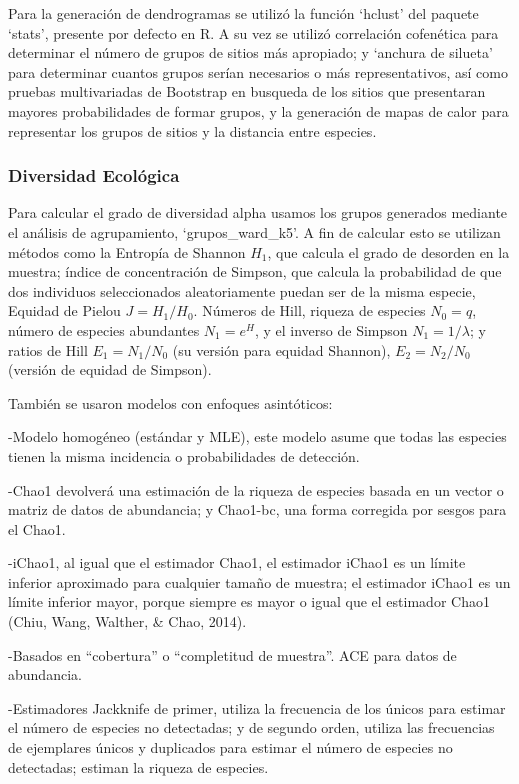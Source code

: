 \documentclass[11pt,]{article}
\begin{document}
Para la generación de dendrogramas se utilizó la función `hclust' del
paquete `stats', presente por defecto en R. A su vez se utilizó
correlación cofenética para determinar el número de grupos de sitios más
apropiado; y `anchura de silueta' para determinar cuantos grupos serían
necesarios o más representativos, así como pruebas multivariadas de
Bootstrap en busqueda de los sitios que presentaran mayores
probabilidades de formar grupos, y la generación de mapas de calor para
representar los grupos de sitios y la distancia entre especies.

\subsubsection{Diversidad Ecológica}\label{diversidad-ecoluxf3gica}

Para calcular el grado de diversidad alpha usamos los grupos generados
mediante el análisis de agrupamiento, `grupos\_ward\_k5'. A fin de
calcular esto se utilizan métodos como la Entropía de Shannon \(H_1\),
que calcula el grado de desorden en la muestra; índice de concentración
de Simpson, que calcula la probabilidad de que dos individuos
seleccionados aleatoriamente puedan ser de la misma especie, Equidad de
Pielou \(J=H_1/H_0\). Números de Hill, riqueza de especies \(N_0=q\),
número de especies abundantes \(N_1=e^H\), y el inverso de Simpson
\(N_1=1/\lambda\); y ratios de Hill \(E_1=N_1/N_0\) (su versión para
equidad Shannon), \(E_2=N_2/N_0\) (versión de equidad de Simpson).

También se usaron modelos con enfoques asintóticos:

-Modelo homogéneo (estándar y MLE), este modelo asume que todas las
especies tienen la misma incidencia o probabilidades de detección.

-Chao1 devolverá una estimación de la riqueza de especies basada en un
vector o matriz de datos de abundancia; y Chao1-bc, una forma corregida
por sesgos para el Chao1.

-iChao1, al igual que el estimador Chao1, el estimador iChao1 es un
límite inferior aproximado para cualquier tamaño de muestra; el
estimador iChao1 es un límite inferior mayor, porque siempre es mayor o
igual que el estimador Chao1 (Chiu, Wang, Walther, \& Chao, 2014).

-Basados en ``cobertura'' o ``completitud de muestra''. ACE para datos
de abundancia.

-Estimadores Jackknife de primer, utiliza la frecuencia de los únicos
para estimar el número de especies no detectadas; y de segundo orden,
utiliza las frecuencias de ejemplares únicos y duplicados para estimar
el número de especies no detectadas; estiman la riqueza de especies.
\end{document}
